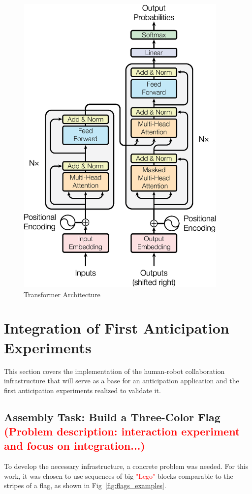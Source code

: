 \begin{figure}[h]
\centerline{\includegraphics[height=6in]{figs/transformer.jpg}}
\caption[Transformer Architecture]{Transformer Architecture \cite{Vaswani2017}}
\label{fig:transformer_arch}
\end{figure}

\section{Integration of First Anticipation Experiments}

This section covers the implementation of the human-robot collaboration infrastructure that will serve as a base for an anticipation application and the first anticipation experiments realized to validate it.

\subsection{Assembly Task: Build a Three-Color Flag \textcolor{red}{(Problem description: interaction experiment and focus on integration...)}}

To develop the necessary infrastructure, a concrete problem was needed. For this work, it was chosen to use sequences of big \textcolor{red}{"Lego"} blocks comparable to the stripes of a flag, as shown in Fig~\ref{fig:flags_examples}.

